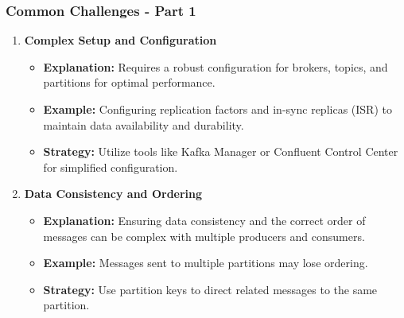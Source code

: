 \documentclass[aspectratio=169]{beamer}
\begin{document}
\begin{frame}[fragile]
    \frametitle{Common Challenges - Part 1}
    \begin{enumerate}
        \item \textbf{Complex Setup and Configuration}
        \begin{itemize}
            \item \textbf{Explanation:} Requires a robust configuration for brokers, topics, and partitions for optimal performance.
            \item \textbf{Example:} Configuring replication factors and in-sync replicas (ISR) to maintain data availability and durability.
            \item \textbf{Strategy:} Utilize tools like Kafka Manager or Confluent Control Center for simplified configuration.
        \end{itemize}

        \item \textbf{Data Consistency and Ordering}
        \begin{itemize}
            \item \textbf{Explanation:} Ensuring data consistency and the correct order of messages can be complex with multiple producers and consumers.
            \item \textbf{Example:} Messages sent to multiple partitions may lose ordering.
            \item \textbf{Strategy:} Use partition keys to direct related messages to the same partition.
        \end{itemize}
    \end{enumerate}
\end{frame}
\end{document}
